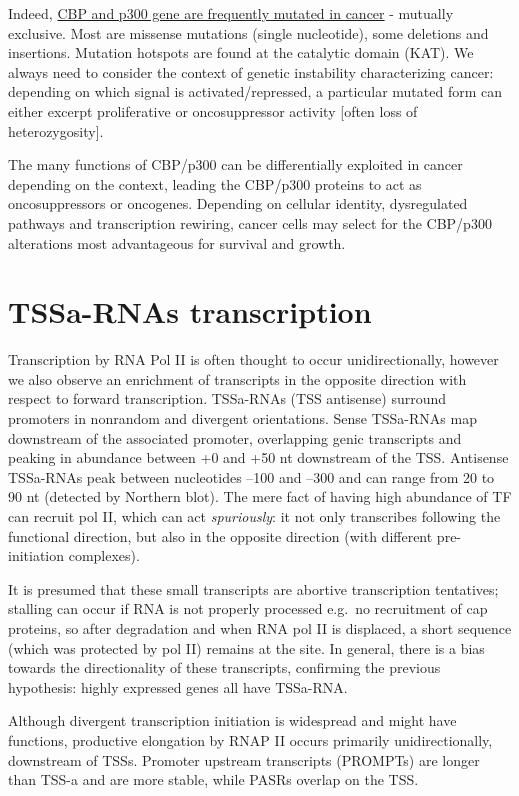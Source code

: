 Indeed, \underline{CBP and p300 gene are frequently mutated in cancer} - mutually exclusive. Most are missense mutations (single nucleotide), some deletions and insertions. Mutation hotspots are found at the catalytic domain (KAT). We always need to consider the context of genetic instability characterizing cancer: depending on which signal is activated/repressed, a particular mutated form can either excerpt proliferative or oncosuppressor activity {[}often loss of heterozygosity{]}.

The many functions of CBP/p300 can be differentially exploited in cancer depending on the context, leading the CBP/p300 proteins to act as oncosuppressors or oncogenes. Depending on cellular identity, dysregulated pathways and transcription rewiring, cancer cells may select for the CBP/p300 alterations most advantageous for survival and growth.

\hypertarget{tssa-rnas-transcription}{%
\section{TSSa-RNAs transcription}\label{tssa-rnas-transcription}}

Transcription by RNA Pol II is often thought to occur unidirectionally, however we also observe an enrichment of transcripts in the opposite direction with respect to forward transcription. TSSa-RNAs (TSS antisense) surround promoters in nonrandom and divergent orientations. Sense TSSa-RNAs map downstream of the associated promoter, overlapping genic transcripts and peaking in abundance between +0 and +50 nt downstream of the TSS. Antisense TSSa-RNAs peak between nucleotides --100 and --300 and can range from 20 to 90 nt (detected by Northern blot). The mere fact of having high abundance of TF can recruit pol II, which can act \emph{spuriously}: it not only transcribes following the functional direction, but also in the opposite direction (with different pre-initiation complexes).

It is presumed that these small transcripts are abortive transcription tentatives; stalling can occur if RNA is not properly processed e.g.~no recruitment of cap proteins, so after degradation and when RNA pol II is displaced, a short sequence (which was protected by pol II) remains at the site. In general, there is a bias towards the directionality of these transcripts, confirming the previous hypothesis: highly expressed genes all have TSSa-RNA.

Although divergent transcription initiation is widespread and might have functions, productive elongation by RNAP II occurs primarily unidirectionally, downstream of TSSs. Promoter upstream transcripts (PROMPTs) are longer than TSS-a and are more stable, while PASRs overlap on the TSS.

